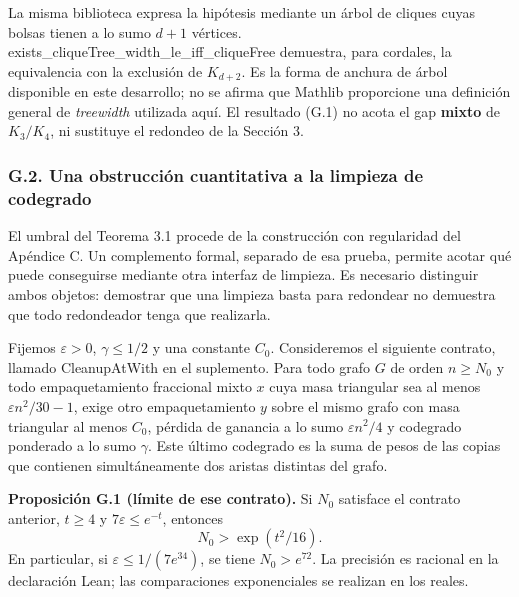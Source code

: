 \documentclass[spanish,11pt,a4paper]{article}
\begin{document}
La misma biblioteca expresa la hipótesis mediante un árbol de cliques cuyas bolsas tienen a lo sumo \(d+1\) vértices. {\ttfamily\small exists\_\discretionary{\hbox{\ensuremath{\hookrightarrow}}}{}{}cliqueTree\_\discretionary{\hbox{\ensuremath{\hookrightarrow}}}{}{}width\_\discretionary{\hbox{\ensuremath{\hookrightarrow}}}{}{}le\_\discretionary{\hbox{\ensuremath{\hookrightarrow}}}{}{}iff\_\discretionary{\hbox{\ensuremath{\hookrightarrow}}}{}{}cliqueFree} demuestra, para cordales, la equivalencia con la exclusión de \(K_{d+2}\). Es la forma de anchura de árbol disponible en este desarrollo; no se afirma que Mathlib proporcione una definición general de \emph{treewidth} utilizada aquí. El resultado (G.1) no acota el gap \textbf{mixto} de \(K_3/K_4\), ni sustituye el redondeo de la Sección 3.

\subsubsection{G.2. Una obstrucción cuantitativa a la limpieza de codegrado}\label{g.2.-una-obstruccion-cuantitativa-a-la-limpieza-de-codegrado}

El umbral del Teorema 3.1 procede de la construcción con regularidad del Apéndice C. Un complemento formal, separado de esa prueba, permite acotar qué puede conseguirse mediante otra interfaz de limpieza. Es necesario distinguir ambos objetos: demostrar que una limpieza basta para redondear no demuestra que todo redondeador tenga que realizarla.

Fijemos \(\varepsilon>0\), \(\gamma\le1/2\) y una constante \(C_0\). Consideremos el siguiente contrato, llamado {\ttfamily\small CleanupAtWit\discretionary{\hbox{\ensuremath{\hookrightarrow}}}{}{}h} en el suplemento. Para todo grafo \(G\) de orden \(n\ge N_0\) y todo empaquetamiento fraccional mixto \(x\) cuya masa triangular sea al menos \(\varepsilon n^2/30-1\), exige otro empaquetamiento \(y\) sobre el mismo grafo con masa triangular al menos \(C_0\), pérdida de ganancia a lo sumo \(\varepsilon n^2/4\) y codegrado ponderado a lo sumo \(\gamma\). Este último codegrado es la suma de pesos de las copias que contienen simultáneamente dos aristas distintas del grafo.

\textbf{Proposición G.1 (límite de ese contrato).} Si \(N_0\) satisface el contrato anterior, \(t\ge4\) y \(7\varepsilon\le e^{-t}\), entonces \[
N_0>\exp(t^2/16).
\tag{G.2}
\] En particular, si \(\varepsilon\le1/(7e^{34})\), se tiene \(N_0>e^{72}\). La precisión es racional en la declaración Lean; las comparaciones exponenciales se realizan en los reales.
\end{document}
